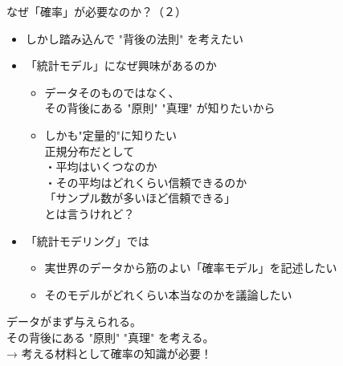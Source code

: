\documentclass[dvipdfmx,cjk]{beamer}
\begin{document}
\begin{frame}{なぜ「確率」が必要なのか？（２）}


\begin{itemize}

    \item しかし踏み込んで "背後の法則" を考えたい \pause

    \item 「統計モデル」になぜ興味があるのか\pause
        \begin{itemize}
        \item データそのものではなく、\\その背後にある "原則" "真理" が知りたいから\\\pause
        \item しかも"定量的"に知りたい\\ \pause
        正規分布だとして \\ \pause
        ・平均はいくつなのか \\ \pause
        ・その平均はどれくらい信頼できるのか \\ \pause
        「サンプル数が多いほど信頼できる」\\
        とは言うけれど？
        \end{itemize}
        
    \pause
    \item 「統計モデリング」では \pause
    \pause
        \begin{itemize}
        \item 実世界のデータから筋のよい「確率モデル」を記述したい
        \item そのモデルがどれくらい本当なのかを議論したい
        \end{itemize}

    \pause

\end{itemize}

\vskip 0.3cm

データがまず与えられる。\\ \pause
その背後にある "原則" "真理" を考える。\\ \pause
→ 考える材料として確率の知識が必要！

\end{frame}
\end{document}
